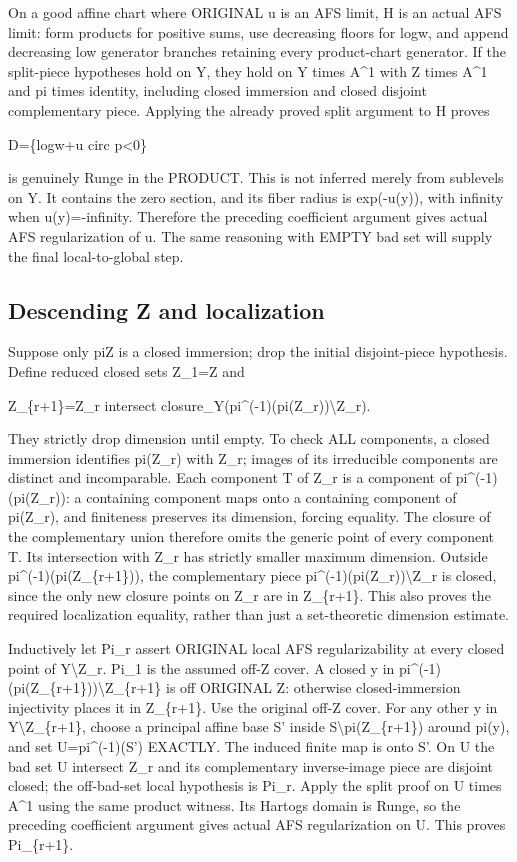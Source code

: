 \documentclass[
  10pt,
]{article}
\begin{document}
On a good affine chart where ORIGINAL u is an AFS limit, H is an actual
AFS limit: form products for positive sums, use decreasing floors for
log\textbar w\textbar, and append decreasing low generator branches
retaining every product-chart generator. If the split-piece hypotheses
hold on Y, they hold on Y times A\^{}1 with Z times A\^{}1 and pi times
identity, including closed immersion and closed disjoint complementary
piece. Applying the already proved split argument to H proves

D=\{log\textbar w\textbar+u circ p\textless0\}

is genuinely Runge in the PRODUCT. This is not inferred merely from
sublevels on Y. It contains the zero section, and its fiber radius is
exp(-u(y)), with infinity when u(y)=-infinity. Therefore the preceding
coefficient argument gives actual AFS regularization of u. The same
reasoning with EMPTY bad set will supply the final local-to-global step.

\subsection{Descending Z and
localization}\label{descending-z-and-localization}

Suppose only pi\textbar Z is a closed immersion; drop the initial
disjoint-piece hypothesis. Define reduced closed sets Z\_1=Z and

Z\_\{r+1\}=Z\_r intersect
closure\_Y(pi\^{}(-1)(pi(Z\_r))\textbackslash Z\_r).

They strictly drop dimension until empty. To check ALL components, a
closed immersion identifies pi(Z\_r) with Z\_r; images of its
irreducible components are distinct and incomparable. Each component T
of Z\_r is a component of pi\^{}(-1)(pi(Z\_r)): a containing component
maps onto a containing component of pi(Z\_r), and finiteness preserves
its dimension, forcing equality. The closure of the complementary union
therefore omits the generic point of every component T. Its intersection
with Z\_r has strictly smaller maximum dimension. Outside
pi\^{}(-1)(pi(Z\_\{r+1\})), the complementary piece
pi\^{}(-1)(pi(Z\_r))\textbackslash Z\_r is closed, since the only new
closure points on Z\_r are in Z\_\{r+1\}. This also proves the required
localization equality, rather than just a set-theoretic dimension
estimate.

Inductively let Pi\_r assert ORIGINAL local AFS regularizability at
every closed point of Y\textbackslash Z\_r. Pi\_1 is the assumed off-Z
cover. A closed y in pi\^{}(-1)(pi(Z\_\{r+1\}))\textbackslash Z\_\{r+1\}
is off ORIGINAL Z: otherwise closed-immersion injectivity places it in
Z\_\{r+1\}. Use the original off-Z cover. For any other y in
Y\textbackslash Z\_\{r+1\}, choose a principal affine base S' inside
S\textbackslash pi(Z\_\{r+1\}) around pi(y), and set U=pi\^{}(-1)(S')
EXACTLY. The induced finite map is onto S'. On U the bad set U intersect
Z\_r and its complementary inverse-image piece are disjoint closed; the
off-bad-set local hypothesis is Pi\_r. Apply the split proof on U times
A\^{}1 using the same product witness. Its Hartogs domain is Runge, so
the preceding coefficient argument gives actual AFS regularization on U.
This proves Pi\_\{r+1\}.
\end{document}
